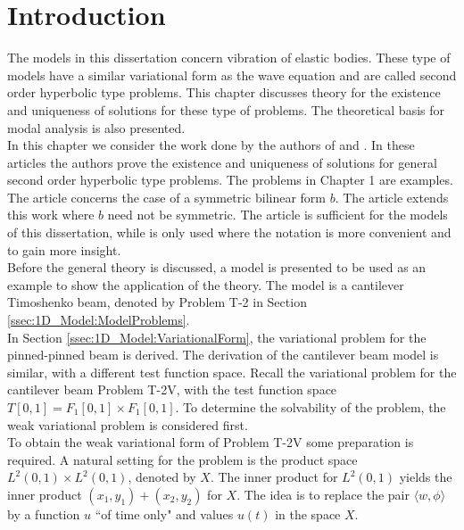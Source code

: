 \documentclass[../../main.tex]{subfiles}
\begin{document}
\section{Introduction} \label{sec:existence}
The models in this dissertation concern vibration of elastic bodies. These type of models have a similar variational form as the wave equation and are called second order hyperbolic type problems. This chapter discusses theory for the existence and uniqueness of solutions for these type of problems. The theoretical basis for modal analysis is also presented.\\

In this chapter we consider the work done by the authors of \cite{VV02} and \cite{VS19}. In these articles the authors prove the existence and uniqueness of solutions for general second order hyperbolic type problems. The problems in Chapter 1 are examples. The article \cite{VV02} concerns the case of a symmetric bilinear form $b$. The article \cite{VS19} extends this work where $b$ need not be symmetric. The article \cite{VV02} is sufficient for the models of this dissertation, while \cite{VS19} is only used where the notation is more convenient and to gain more insight.\\

Before the general theory is discussed, a model is presented to be used as an example to show the application of the theory. The model is a cantilever Timoshenko beam, denoted by Problem T-2 in Section \ref{ssec:1D_Model:ModelProblems}.\\

In Section \ref{ssec:1D_Model:VariationalForm}, the variational problem for the pinned-pinned beam is derived. The derivation of the cantilever beam model is similar, with a different test function space. Recall the variational problem for the cantilever beam Problem T-2V, with the test function space $\displaystyle T[0,1] = F_1[0,1] \times F_1[0,1]$. To determine the solvability of the problem, the weak variational problem is considered first.\\


To obtain the weak variational form of Problem T-2V some preparation is required. A natural setting for the problem is the product space $L^2(0,1)\times L^2(0,1)$, denoted by $X$. The inner product for $L^2(0,1)$ yields the inner product $\displaystyle (x_1,y_1) + (x_2,y_2)$ for $X$. The idea is to replace the pair $\langle w , \phi \rangle$ by a function $u$ ``of time only" and values $u(t)$ in the space $X$.\\
\end{document}
